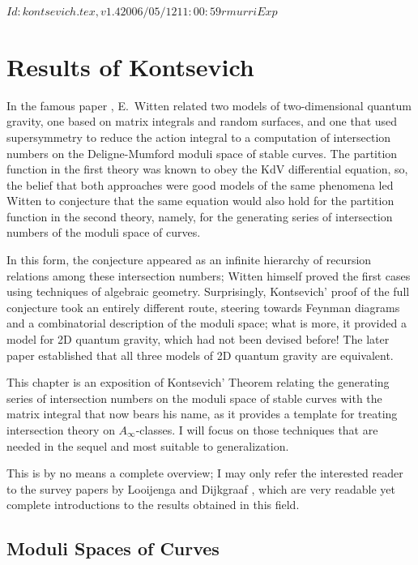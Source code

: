 \RCSID $Id: kontsevich.tex,v 1.4 2006/05/12 11:00:59 rmurri Exp $


\chapter{Results of Kontsevich}
\label{cha:kontsevich}


In the famous paper \cite{witten;intersection-theory}, E.~Witten
related two models of two-dimensional quantum gravity, one based on
matrix integrals and random surfaces, and one that used supersymmetry
to reduce the action integral to a computation of intersection numbers
on the Deligne-Mumford moduli space of stable curves. The partition
function in the first theory was known to obey the KdV differential
equation, so, the belief that both approaches were good models of the
same phenomena led Witten to conjecture that the same equation would
also hold for the partition function in the second theory, namely, for
the generating series of intersection numbers of the moduli space of
curves.

In this form, the conjecture appeared as an infinite hierarchy of
recursion relations among these intersection numbers; Witten himself
proved the first cases using techniques of algebraic geometry.
Surprisingly, Kontsevich' proof of the full conjecture took an
entirely different route, steering towards Feynman diagrams and a
combinatorial description of the moduli space; what is more, it
provided a model for 2D quantum gravity, which had not been devised
before!  The later paper \cite{witten;kontsevich-model} established
that all three models of 2D quantum gravity are equivalent.

This chapter is an exposition of Kontsevich' Theorem relating the
generating series of intersection numbers on the moduli space of
stable curves with the matrix integral that now bears his name, as it
provides a template for treating intersection theory on $A_\infty$-classes.
I will focus on those techniques that are needed in the sequel and
most suitable to generalization.

This is by no means a complete overview; I may only refer the
interested reader to the survey papers by Looijenga
\cite{looijenga;intersection-theory} and Dijkgraaf
\cite{dijkgraaf;intersection-theory}, which are very readable yet
complete introductions to the results obtained in this field.


\section{Moduli Spaces of Curves}
\label{sec:moduli-spaces}

